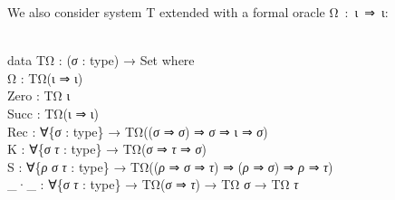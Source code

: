 \documentclass{entcs} \usepackage{prentcsmacro}
\newcommand{\AgdaC}[1]{\mbox{#1}}
\newcommand{\AgdaFontStyle}[1]{\textsf{#1}}
\newcommand{\AgdaBoundFontStyle}[1]{\textit{#1}}
\newcommand{\AgdaKeyword}     [1]
    {\AgdaFontStyle{\textcolor{AgdaKeyword}{#1}}}
\newcommand{\AgdaSymbol}      [1]{\textcolor{AgdaSymbol}{#1}}
\newcommand{\AgdaPrimitiveType}[1]
    {\AgdaFontStyle{\textcolor{AgdaPrimitiveType}{#1}}}
\newcommand{\AgdaBound}    [1]{\AgdaBoundFontStyle{\textcolor{AgdaBound}{#1}}}
\newcommand{\AgdaInductiveConstructor}[1]
    {\AgdaFontStyle{\textcolor{AgdaInductiveConstructor}{#1}}}
\newcommand{\AgdaDatatype} [1]{\AgdaFontStyle{\textcolor{AgdaDatatype}{#1}}}
\newcommand{\AgdaIndent}[1]{\quad}
\newcommand{\AgdaCodeStyle}{\small}
\newenvironment{code}%
{\noindent\AgdaCodeStyle\pboxed}%
{\endpboxed\par\noindent%
\ignorespacesafterend}
\begin{document}
We also consider system T extended with a formal oracle \AgdaC{Ω : ι ⇒
ι}:

\begin{code}\>\<%
\\
\>\AgdaKeyword{data} \AgdaDatatype{TΩ} \AgdaSymbol{:} \AgdaSymbol{(}\AgdaBound{σ} \AgdaSymbol{:} \AgdaDatatype{type}\AgdaSymbol{)} \AgdaSymbol{→} \AgdaPrimitiveType{Set} \AgdaKeyword{where}\<%
\\
\>[0]\AgdaIndent{2}{}\<[2]%
\>[2]\AgdaInductiveConstructor{Ω} \<[7]%
\>[7]\AgdaSymbol{:} \AgdaDatatype{TΩ}\AgdaSymbol{(}\AgdaInductiveConstructor{ι} \AgdaInductiveConstructor{⇒} \AgdaInductiveConstructor{ι}\AgdaSymbol{)}\<%
\\
\>[0]\AgdaIndent{2}{}\<[2]%
\>[2]\AgdaInductiveConstructor{Zero} \<[9]%
\>[9]\AgdaSymbol{:} \AgdaDatatype{TΩ} \AgdaInductiveConstructor{ι}\<%
\\
\>[0]\AgdaIndent{2}{}\<[2]%
\>[2]\AgdaInductiveConstructor{Succ} \<[9]%
\>[9]\AgdaSymbol{:} \AgdaDatatype{TΩ}\AgdaSymbol{(}\AgdaInductiveConstructor{ι} \AgdaInductiveConstructor{⇒} \AgdaInductiveConstructor{ι}\AgdaSymbol{)}\<%
\\
\>[0]\AgdaIndent{2}{}\<[2]%
\>[2]\AgdaInductiveConstructor{Rec} \<[7]%
\>[7]\AgdaSymbol{:} \AgdaSymbol{∀\{}\AgdaBound{σ} \AgdaSymbol{:} \AgdaDatatype{type}\AgdaSymbol{\}} \<[25]%
\>[25]\AgdaSymbol{→} \AgdaDatatype{TΩ}\AgdaSymbol{((}\AgdaBound{σ} \AgdaInductiveConstructor{⇒} \AgdaBound{σ}\AgdaSymbol{)} \AgdaInductiveConstructor{⇒} \AgdaBound{σ} \AgdaInductiveConstructor{⇒} \AgdaInductiveConstructor{ι} \AgdaInductiveConstructor{⇒} \AgdaBound{σ}\AgdaSymbol{)}\<%
\\
\>[0]\AgdaIndent{2}{}\<[2]%
\>[2]\AgdaInductiveConstructor{K} \<[7]%
\>[7]\AgdaSymbol{:} \AgdaSymbol{∀\{}\AgdaBound{σ} \AgdaBound{τ} \AgdaSymbol{:} \AgdaDatatype{type}\AgdaSymbol{\}} \<[25]%
\>[25]\AgdaSymbol{→} \AgdaDatatype{TΩ}\AgdaSymbol{(}\AgdaBound{σ} \AgdaInductiveConstructor{⇒} \AgdaBound{τ} \AgdaInductiveConstructor{⇒} \AgdaBound{σ}\AgdaSymbol{)}\<%
\\
\>[0]\AgdaIndent{2}{}\<[2]%
\>[2]\AgdaInductiveConstructor{S} \<[7]%
\>[7]\AgdaSymbol{:} \AgdaSymbol{∀\{}\AgdaBound{ρ} \AgdaBound{σ} \AgdaBound{τ} \AgdaSymbol{:} \AgdaDatatype{type}\AgdaSymbol{\}} \AgdaSymbol{→} \AgdaDatatype{TΩ}\AgdaSymbol{((}\AgdaBound{ρ} \AgdaInductiveConstructor{⇒} \AgdaBound{σ} \AgdaInductiveConstructor{⇒} \AgdaBound{τ}\AgdaSymbol{)} \AgdaInductiveConstructor{⇒} \AgdaSymbol{(}\AgdaBound{ρ} \AgdaInductiveConstructor{⇒} \AgdaBound{σ}\AgdaSymbol{)} \AgdaInductiveConstructor{⇒} \AgdaBound{ρ} \AgdaInductiveConstructor{⇒} \AgdaBound{τ}\AgdaSymbol{)}\<%
\\
\>[0]\AgdaIndent{2}{}\<[2]%
\>[2]\AgdaInductiveConstructor{\_·\_} \<[7]%
\>[7]\AgdaSymbol{:} \AgdaSymbol{∀\{}\AgdaBound{σ} \AgdaBound{τ} \AgdaSymbol{:} \AgdaDatatype{type}\AgdaSymbol{\}} \<[25]%
\>[25]\AgdaSymbol{→} \AgdaDatatype{TΩ}\AgdaSymbol{(}\AgdaBound{σ} \AgdaInductiveConstructor{⇒} \AgdaBound{τ}\AgdaSymbol{)} \AgdaSymbol{→} \AgdaDatatype{TΩ} \AgdaBound{σ} \AgdaSymbol{→} \AgdaDatatype{TΩ} \AgdaBound{τ}\<%
\\
\>\<\end{code}
\end{document}

